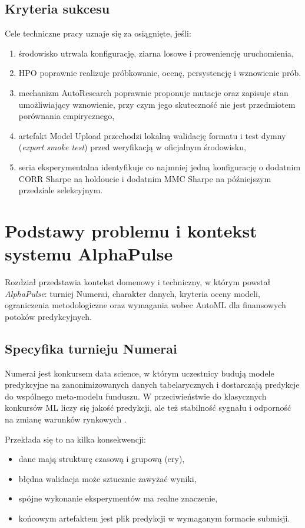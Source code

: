 \documentclass[12pt,a4paper]{report}
\newcommand{\sourcecite}[1]{\autocite{#1}}
\begin{document}
\section{Kryteria sukcesu}
Cele techniczne pracy uznaje się za osiągnięte, jeśli:
\begin{enumerate}\item środowisko utrwala konfigurację, ziarna losowe i proweniencję uruchomienia,
\item HPO poprawnie realizuje próbkowanie, ocenę, persystencję i wznowienie prób.
\item mechanizm AutoResearch poprawnie proponuje mutacje oraz zapisuje stan
    umożliwiający wznowienie, przy czym jego skuteczność nie jest przedmiotem
    porównania empirycznego,
\item artefakt Model Upload przechodzi lokalną walidację formatu i test dymny
    (\textit{export smoke test}) przed weryfikacją w oficjalnym środowisku,
\item seria eksperymentalna identyfikuje co najmniej jedną konfigurację o dodatnim
    CORR Sharpe na holdoucie i dodatnim MMC Sharpe na późniejszym przedziale
    selekcyjnym.\end{enumerate}

\chapter{Podstawy problemu i kontekst systemu AlphaPulse}

Rozdział przedstawia kontekst domenowy i techniczny, w którym powstał
\textit{AlphaPulse}: turniej Numerai, charakter danych, kryteria oceny modeli,
ograniczenia metodologiczne oraz wymagania wobec AutoML dla finansowych
potoków predykcyjnych.

\section{Specyfika turnieju Numerai}
Numerai jest konkursem data science, w którym uczestnicy budują modele predykcyjne
na zanonimizowanych danych tabelarycznych i dostarczają predykcje do wspólnego
meta-modelu funduszu. W przeciwieństwie do klasycznych konkursów ML liczy się
jakość predykcji, ale też stabilność sygnału i odporność na zmianę warunków
rynkowych \sourcecite{numerai-scoring}.

Przekłada się to na kilka konsekwencji:
\begin{itemize}\item dane mają strukturę czasową i grupową (ery),
\item błędna walidacja może sztucznie zawyżać wyniki,
\item spójne wykonanie eksperymentów ma realne znaczenie,
\item końcowym artefaktem jest plik predykcji w wymaganym formacie submisji.\end{itemize}
\end{document}
